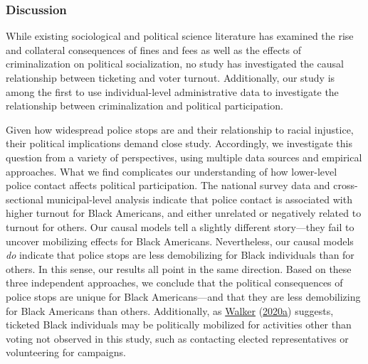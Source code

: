 \documentclass[
  12pt,
]{article}
\begin{document}
\hypertarget{discussion}{%
\subsubsection*{Discussion}\label{discussion}}

While existing sociological and political science literature has examined the rise and collateral consequences of fines and fees as well as the effects of criminalization on political socialization, no study has investigated the causal relationship between ticketing and voter turnout. Additionally, our study is among the first to use individual-level administrative data to investigate the relationship between criminalization and political participation.

Given how widespread police stops are and their relationship to racial injustice, their political implications demand close study. Accordingly, we investigate this question from a variety of perspectives, using multiple data sources and empirical approaches. What we find complicates our understanding of how lower-level police contact affects political participation. The national survey data and cross-sectional municipal-level analysis indicate that police contact is associated with higher turnout for Black Americans, and either unrelated or negatively related to turnout for others. Our causal models tell a slightly different story---they fail to uncover mobilizing effects for Black Americans. Nevertheless, our causal models \emph{do} indicate that police stops are less demobilizing for Black individuals than for others. In this sense, our results all point in the same direction. Based on these three independent approaches, we conclude that the political consequences of police stops are unique for Black Americans---and that they are less demobilizing for Black Americans than others. Additionally, as \protect\hyperlink{ref-Walker2020a}{Walker} (\protect\hyperlink{ref-Walker2020a}{2020a}) suggests, ticketed Black individuals may be politically mobilized for activities other than voting not observed in this study, such as contacting elected representatives or volunteering for campaigns.
\end{document}
